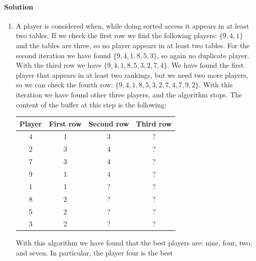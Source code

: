 \paragraph*{Solution}
\begin{enumerate}
    \item A player is considered when, while doing sorted access it appears in at least two tables. If we check the first row we find the following players: 
        $\{9,4,1\}$ and the tables are three, so no player appears in at least two tables. For the second iteration we have found $\{9,4,1,8,5,3\}$, so again
        no duplicate player. With the third row we have $\{9,4,1,8,5,3,2,7,4\}$. We have found the first player that appears in at least two rankings, but we 
        need two more players, so we can check the fourth row: $\{9,4,1,8,5,3,2,7,4,7,9,2\}$. With this iteration we have found other three players, and 
        the algorithm stops. The content of the buffer at this step is the following: 
        \begin{table}[H]
            \centering
            \begin{tabular}{|c|ccc|}
            \hline
            \textbf{Player} & \textbf{First row} & \textbf{Second row} & \textbf{Third row} \\ \hline
            4               & 1                  & 3                   & ?                  \\
            2               & 3                  & 4                   & ?                  \\
            7               & 3                  & 4                   & ?                  \\ 
            9               & 1                  & 4                   & ?                  \\
            1               & 1                  & ?                   & ?                  \\
            8               & 2                  & ?                   & ?                  \\
            5               & 2                  & ?                   & ?                  \\
            3               & 2                  & ?                   & ?                  \\ \hline
            \end{tabular}
        \end{table}
        With this algorithm we have found that the best players are: nine, four, two, and seven. In particular, the player four is the best 

\end{enumerate}
